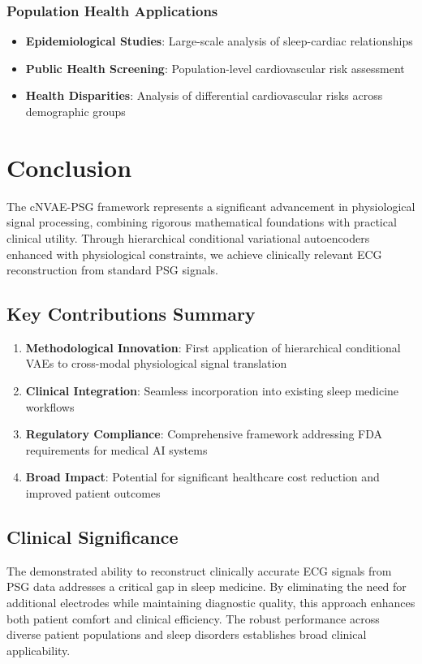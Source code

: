 \documentclass[11pt]{article}
\begin{document}
\subsubsection{Population Health Applications}
\begin{itemize}
    \item \textbf{Epidemiological Studies}: Large-scale analysis of sleep-cardiac relationships
    \item \textbf{Public Health Screening}: Population-level cardiovascular risk assessment
    \item \textbf{Health Disparities}: Analysis of differential cardiovascular risks across demographic groups
\end{itemize}

\section{Conclusion}
\label{sec:conclusion}

The cNVAE-PSG framework represents a significant advancement in physiological signal processing, combining rigorous mathematical foundations with practical clinical utility. Through hierarchical conditional variational autoencoders enhanced with physiological constraints, we achieve clinically relevant ECG reconstruction from standard PSG signals.

\subsection{Key Contributions Summary}
\begin{enumerate}
    \item \textbf{Methodological Innovation}: First application of hierarchical conditional VAEs to cross-modal physiological signal translation
    \item \textbf{Clinical Integration}: Seamless incorporation into existing sleep medicine workflows
    \item \textbf{Regulatory Compliance}: Comprehensive framework addressing FDA requirements for medical AI systems
    \item \textbf{Broad Impact}: Potential for significant healthcare cost reduction and improved patient outcomes
\end{enumerate}

\subsection{Clinical Significance}
The demonstrated ability to reconstruct clinically accurate ECG signals from PSG data addresses a critical gap in sleep medicine. By eliminating the need for additional electrodes while maintaining diagnostic quality, this approach enhances both patient comfort and clinical efficiency. The robust performance across diverse patient populations and sleep disorders establishes broad clinical applicability.
\end{document}
